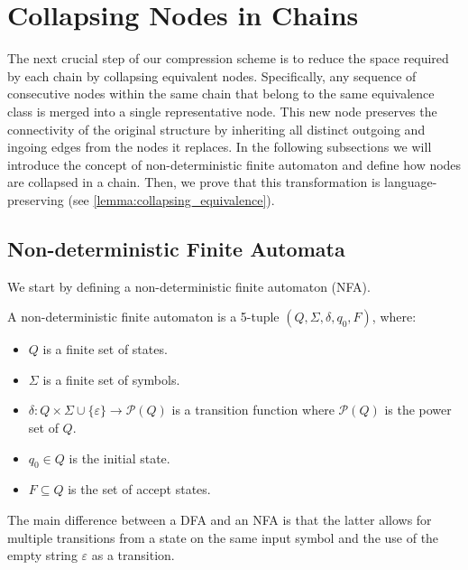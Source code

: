 \section{Collapsing Nodes in Chains} \label{sec:collapsing}
The next crucial step of our compression scheme is to reduce the space required by each chain by collapsing equivalent nodes. Specifically, any sequence of consecutive nodes within the same chain that belong to the same equivalence class is merged into a single representative node. This new node preserves the connectivity of the original structure by inheriting all distinct outgoing and ingoing edges from the nodes it replaces. In the following subsections we will introduce the concept of non-deterministic finite automaton and define how nodes are collapsed in a chain. Then, we prove that this transformation is language-preserving (see \cref{lemma:collapsing_equivalence}).

\subsection{Non-deterministic Finite Automata}
We start by defining a non-deterministic finite automaton (NFA).  
\begin{definition} \label{def:nfa}
    A non-deterministic finite automaton is a 5-tuple $(Q, \Sigma, \delta, q_0, F)$, where:
    \begin{itemize}[leftmargin=25pt]
        \item $Q$ is a finite set of states.
        \item $\Sigma$ is a finite set of symbols.
        \item $\delta: Q \times \Sigma \cup \{\varepsilon\} \to \mathcal{P}(Q)$ is a transition function where $\mathcal{P}(Q)$ is the power set of $Q$.
        \item $q_0 \in Q$ is the initial state.
        \item $F \subseteq Q$ is the set of accept states.
    \end{itemize}
\end{definition}
The main difference between a DFA and an NFA is that the latter allows for multiple transitions from a state on the same input symbol and the use of the empty string $\varepsilon$ as a transition.


